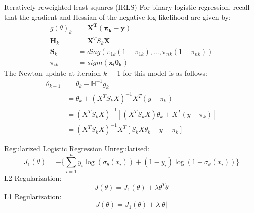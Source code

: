 \documentclass{beamer}
\begin{document}
\begin{frame}{Iteratively reweighted least squares (IRLS)}
For binary logistic regression, recall that the gradient and Hessian of the negative log-likelihood are given by:
\begin{align*}
g(\theta)_{k} &= \mathbf{X^{T}(\pi_{k} - y)} \\
\mathbf{H}_{k} &= \mathbf{X}^{T}S_{k}\mathbf{X} \\
\mathbf{S}_{k} &= diag(\pi_{1k}(1 - \pi_{1k}), \ldots, \pi_{nk}(1 - \pi_{nk})) \\
\pi_{ik} &= sigm(\mathbf{x_{i}\theta_{k}})
\end{align*}
The Newton update at iteraion $k$ + 1 for this model is as follows:
\begin{align*}
\theta_{k+1} &= \theta_{k} - \mathbb{H}^{-1}g_{k} \\
&= \theta_{k} + (X^{T}S_{k}X)^{-1}X^{T}(y - \pi_{k}) \\
&= (X^{T}S_{k}X)^{-1}[(X^{T}S_{k}X)\theta_{k} + X^{T}(y - \pi_{k})] \\
&= (X^{T}S_{k}X)^{-1}X^{T}[S_{k}X\theta_{k} + y - \pi_{k}]
\end{align*}
\end{frame}
\begin{frame}{Regularized Logistic Regression}
Unregularised:
\begin{equation*}
J_{1}(\theta) = -\bigg\{\sum_{i=1}^{n}y_{i}\log(\sigma_{\theta}(x_{i})) + (1 - y_{i})\log(1 - \sigma_{\theta}(x_{i}))\bigg\}
\end{equation*}
L2 Regularization:
\begin{equation*}
J(\theta) = J_{1}(\theta) + \lambda\theta^{T}\theta
\end{equation*}
L1 Regularization:
\begin{equation*}
J(\theta) = J_{1}(\theta) + \lambda|\theta|
\end{equation*}
\end{frame}
\end{document}
